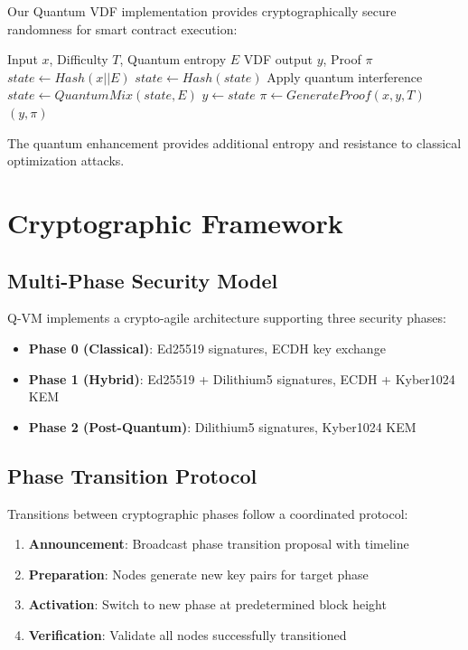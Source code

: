 \documentclass[11pt]{article}
\begin{document}
Our Quantum VDF implementation provides cryptographically secure randomness for smart contract execution:

\begin{algorithm}
\caption{Quantum VDF Computation}
\begin{algorithmic}[1]
\REQUIRE Input $x$, Difficulty $T$, Quantum entropy $E$
\ENSURE VDF output $y$, Proof $\pi$
\STATE $state \leftarrow Hash(x || E)$
    \STATE $state \leftarrow Hash(state)$
        \STATE Apply quantum interference
        \STATE $state \leftarrow QuantumMix(state, E)$
    \ENDIF
\ENDFOR
\STATE $y \leftarrow state$
\STATE $\pi \leftarrow GenerateProof(x, y, T)$
\RETURN $(y, \pi)$
\end{algorithmic}
\end{algorithm}

The quantum enhancement provides additional entropy and resistance to classical optimization attacks.

\section{Cryptographic Framework}

\subsection{Multi-Phase Security Model}

Q-VM implements a crypto-agile architecture supporting three security phases:

\begin{itemize}
    \item \textbf{Phase 0 (Classical)}: Ed25519 signatures, ECDH key exchange
    \item \textbf{Phase 1 (Hybrid)}: Ed25519 + Dilithium5 signatures, ECDH + Kyber1024 KEM
    \item \textbf{Phase 2 (Post-Quantum)}: Dilithium5 signatures, Kyber1024 KEM
\end{itemize}

\subsection{Phase Transition Protocol}

Transitions between cryptographic phases follow a coordinated protocol:

\begin{enumerate}
    \item \textbf{Announcement}: Broadcast phase transition proposal with timeline
    \item \textbf{Preparation}: Nodes generate new key pairs for target phase
    \item \textbf{Activation}: Switch to new phase at predetermined block height
    \item \textbf{Verification}: Validate all nodes successfully transitioned
\end{enumerate}
\end{document}
